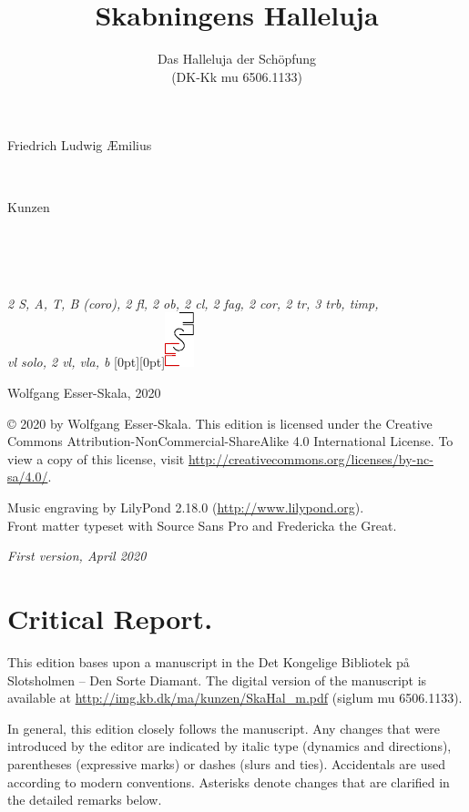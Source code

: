 \documentclass[parskip=full]{scrreprt}
\makeatletter
\DeclareRobustCommand{\sbseries}{\fontseries{sb}\selectfont}
\newcommand\fancytitlehead{
	\headingfont%
	\fontsize{80}{80}\selectfont\textcolor{black!80}{\@lastname.}\\[15pt]%
	\fontsize{60}{60}\selectfont\@ifundefined{@shorttitle}{\@title}{\@shorttitle}.%
}
\def\firstname#1{\def\@firstname{#1}}
\def\lastname#1{\def\@lastname{#1}}
\def\shorttitle#1{\def\@shorttitle{#1}}
\def\instrumentation#1{\def\@instrumentation{#1}}
\def\maketitle{%
\begin{titlepage}%
	\Large%
	{\@titlehead}%
	\vfill%
	{\strut\@firstname}\\%
	{\sbseries\color{oldred}\strut\@lastname}\\%
	{\strut\@namesuffix}%
	\vfill%
	{\sbseries\@title}\\%
	{\@subtitle}\\[\baselineskip]%
	{\itshape\@instrumentation}%
	\vfill%
	{\itshape\@parts}\hspace*{\fill}\raisebox{0pt}[0pt][0pt]{\includegraphics{ees_logo}}%
\end{titlepage}%
}
\newif\ifprintreport\printreportfalse
\makeatother
\begin{document}
\titlehead{\fancytitlehead}
\firstname{Friedrich Ludwig Æmilius} %
\lastname{Kunzen}
\title{Skabningens Halleluja}
\shorttitle{Skabningens\\Halleluja}
\subtitle{Das Halleluja der Schöpfung\\(DK-Kk mu 6506.1133)}
\instrumentation{2 S, A, T, B (coro), 2 fl, 2 ob, 2 cl, 2 fag, 2 cor, 2 tr, 3 trb, timp,\\vl solo, 2 vl, vla, b}
\maketitle


\thispagestyle{empty}

\vspace*{\fill}

\hspace*{1em}Wolfgang Esser-Skala, 2020

© 2020 by Wolfgang Esser-Skala. This edition is licensed under the Creative Commons Attribution-NonCommercial-ShareAlike 4.0 International License. To view a copy of this license, visit \url{http://creativecommons.org/licenses/by-nc-sa/4.0/}. 

Music engraving by LilyPond 2.18.0 (\url{http://www.lilypond.org}).\\
Front matter typeset with Source Sans Pro and Fredericka the Great.

\textit{First version, April 2020}

\vspace*{2cm}

\ifprintreport
\chapter*{Critical Report.}

This edition bases upon a manuscript in the Det Kongelige Bibliotek på Slotsholmen – Den Sorte Diamant. The digital version of the manuscript is available at \url{http://img.kb.dk/ma/kunzen/SkaHal_m.pdf} (siglum mu 6506.1133).

In general, this edition closely follows the manuscript. Any changes that were introduced by the editor are indicated by italic type (dynamics and directions), parentheses (expressive marks) or dashes (slurs and ties). Accidentals are used according to modern conventions. Asterisks denote changes that are clarified in the detailed remarks below.
\end{document}
